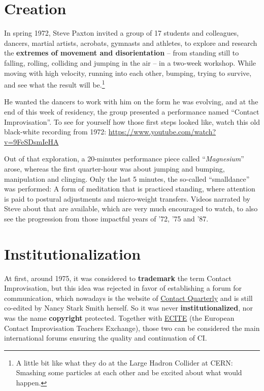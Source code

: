 \section{Creation}\label{sec:creation}

In spring 1972, Steve Paxton invited a group of 17 students and colleagues, dancers, martial artists, acrobats, gymnasts and athletes, to explore and research the \textbf{extremes of movement and disorientation} -- from standing still to falling, rolling, colliding and jumping in the air -- in a two-week workshop.
While moving with high velocity, running into each other, bumping, trying to survive, and see what the result will be.\footnote{A little bit like what they do at the Large Hadron Collider at CERN: Smashing some particles at each other and be excited about what would happen.}

He wanted the dancers to work with him on the form he was evolving, and at the end of this week of residency, the group presented a performance named ``Contact Improvisation''.
To see for yourself how those first steps looked like, watch this old black-white recording from 1972: \url{https://www.youtube.com/watch?v=9FeSDsmIeHA}

Out of that exploration, a 20-minutes performance piece called ``\textit{Magnesium}'' arose, whereas the first quarter-hour was about jumping and bumping, manipulation and clinging.
Only the last 5 minutes, the so-called ``\gls{smalldance}'' was performed: A form of meditation that is practiced standing, where attention is paid to postural adjustments and micro-weight transfers.
Videos narrated by Steve about that are available, which are very much encouraged to watch, to also see the progression from those impactful years of '72, '75 and '87.

\section{Institutionalization}\label{sec:institutionalization}

At first, around 1975, it was considered to \textbf{trademark} the term Contact Improvisation, but this idea was rejected in favor of establishing a forum for communication, which nowadays is the website of \href{https://contactquarterly.com}{Contact Quarterly} and is still co-edited by Nancy Stark Smith herself.
So it was never \textbf{institutionalized}, nor was the name \textbf{copyright} protected.
Together with \href{http://www.ecite.org}{ECITE} (the European Contact Improvisation Teachers Exchange), those two can be considered the main international forums ensuring the quality and continuation of CI\@.

